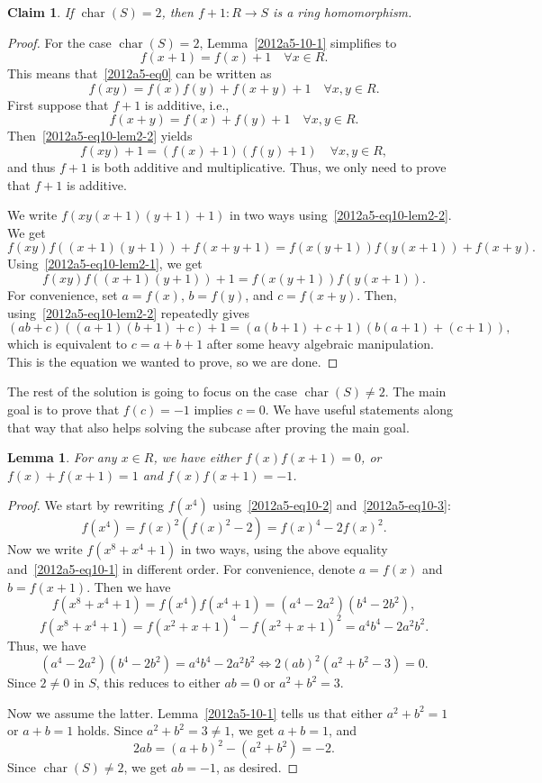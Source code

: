 \documentclass{article}
\DeclareMathOperator{\rchar}{char}
\newtheorem{lemma}{Lemma}
\newtheorem*{claim}{Claim}
\begin{document}
\begin{claim}
If $\rchar(S) = 2$, then $f + 1 : R \to S$ is a ring homomorphism.
\end{claim}
\begin{proof}
For the case $\rchar(S) = 2$, Lemma~\ref{2012a5-10-1} simplifies to
\[ f(x + 1) = f(x) + 1 \quad \forall x \in R. \tag{10.L2.1}\label{2012a5-eq10-lem2-1} \]
This means that~\eqref{2012a5-eq0} can be written as
\[ f(xy) = f(x) f(y) + f(x + y) + 1 \quad \forall x, y \in R. \tag{10.L2.2}\label{2012a5-eq10-lem2-2} \]
First suppose that $f + 1$ is additive, i.e.,
\[ f(x + y) = f(x) + f(y) + 1 \quad \forall x, y \in R. \]
Then~\eqref{2012a5-eq10-lem2-2} yields
\[ f(xy) + 1 = (f(x) + 1)(f(y) + 1) \quad \forall x, y \in R, \]
    and thus $f + 1$ is both additive and multiplicative.
Thus, we only need to prove that $f + 1$ is additive.

We write $f(xy(x + 1)(y + 1) + 1)$ in two ways using~\eqref{2012a5-eq10-lem2-2}.
We get
\[ f(xy) f((x + 1)(y + 1)) + f(x + y + 1) = f(x(y + 1)) f(y(x + 1)) + f(x + y). \]
Using~\eqref{2012a5-eq10-lem2-1}, we get
\[ f(xy) f((x + 1) (y + 1)) + 1 = f(x (y + 1)) f(y(x + 1)). \]
For convenience, set $a = f(x)$, $b = f(y)$, and $c = f(x + y)$.
Then, using~\eqref{2012a5-eq10-lem2-2} repeatedly gives
\[ (ab + c)((a + 1)(b + 1) + c) + 1 = (a(b + 1) + c + 1)(b(a + 1) + (c + 1)), \]
    which is equivalent to $c = a + b + 1$ after some heavy algebraic manipulation.
This is the equation we wanted to prove, so we are done.
\end{proof}



The rest of the solution is going to focus on the case $\rchar(S) \neq 2$.
The main goal is to prove that $f(c) = -1$ implies $c = 0$.
We have useful statements along that way that also helps solving the subcase after proving the main goal.

\begin{lemma}\label{2012a5-10-2}
For any $x \in R$, we have either $f(x) f(x + 1) = 0$, or $f(x) + f(x + 1) = 1$ and $f(x) f(x + 1) = -1$.
\end{lemma}
\begin{proof}
We start by rewriting $f(x^4)$ using~\eqref{2012a5-eq10-2} and~\eqref{2012a5-eq10-3}:
\[ f(x^4) = f(x)^2 (f(x)^2 - 2) = f(x)^4 - 2 f(x)^2. \]
Now we write $f(x^8 + x^4 + 1)$ in two ways, using the above equality and~\eqref{2012a5-eq10-1} in different order.
For convenience, denote $a = f(x)$ and $b = f(x + 1)$.
Then we have
\[ f(x^8 + x^4 + 1) = f(x^4) f(x^4 + 1) = (a^4 - 2a^2)(b^4 - 2b^2), \]
\[ f(x^8 + x^4 + 1) = f(x^2 + x + 1)^4 - f(x^2 + x + 1)^2 = a^4 b^4 - 2 a^2 b^2. \]
Thus, we have
\[ (a^4 - 2a^2)(b^4 - 2b^2) = a^4 b^4 - 2 a^2 b^2 \iff 2 (ab)^2 (a^2 + b^2 - 3) = 0. \]
Since $2 \neq 0$ in $S$, this reduces to either $ab = 0$ or $a^2 + b^2 = 3$.

Now we assume the latter.
Lemma~\ref{2012a5-10-1} tells us that either $a^2 + b^2 = 1$ or $a + b = 1$ holds.
Since $a^2 + b^2 = 3 \neq 1$, we get $a + b = 1$, and
\[ 2ab = (a + b)^2 - (a^2 + b^2) = -2. \]
Since $\rchar(S) \neq 2$, we get $ab = -1$, as desired.
\end{proof}
\end{document}
